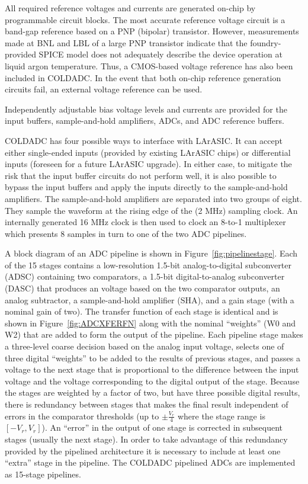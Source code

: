 All required reference voltages and currents are generated on-chip by programmable circuit blocks.  The most accurate reference voltage circuit is a band-gap reference based on a PNP (bipolar) transistor.  However, measurements made at BNL and LBL of a large PNP transistor indicate that the foundry-provided SPICE model does not adequately describe the device operation at liquid argon temperature.  Thus, a CMOS-based voltage reference has also been included in COLDADC.  In the event that both on-chip reference generation circuits fail, an external voltage reference can be used.

Independently adjustable bias voltage levels and currents are provided for the input buffers, sample-and-hold amplifiers, ADCs, and ADC reference buffers.

COLDADC has four possible ways to interface with LArASIC.  It can accept either single-ended inputs (provided by existing LArASIC chips) or differential inputs (foreseen for a future LArASIC upgrade).  In either case, to mitigate the risk that the input buffer circuits do not perform well, it is also possible to bypass the input buffers and apply the inputs directly to the sample-and-hold amplifiers.  The sample-and-hold amplifiers are separated into two groups of eight.  They sample the waveform at the rising edge of the (2 MHz) sampling clock.  An internally generated 16 MHz clock is then used to clock an 8-to-1 multiplexer which presents 8 samples in turn to one of the two ADC pipelines.

A block diagram of an ADC pipeline is shown in Figure~\ref{fig:pipelinestage}. Each of the 15 stages contains a low-resolution 1.5-bit analog-to-digital subconverter (ADSC) containing two comparators, a 1.5-bit digital-to-analog subconverter (DASC) that produces an voltage based on the two comparator outputs, an analog subtractor, a sample-and-hold amplifier (SHA), and a gain stage (with a nominal gain of two). The transfer function of each stage is identical and is shown in Figure~\ref{fig:ADCXFERFN} along with the nominal ``weights'' (W0 and W2) that are added to form the output of the pipeline. Each pipeline stage makes a three-level coarse decision based on the analog input voltage, selects one of three digital ``weights'' to be added to the results of previous stages, and passes a voltage to the next stage that is proportional to the difference between the input voltage and the voltage corresponding to the digital output of the stage.  Because the stages are weighted by a factor of two, but have three possible digital results, there is redundancy between stages that makes the final result independent of errors in the comparator thresholds (up to $\pm{\frac{V_r}{4}}$ where the stage range is $[-V_r,V_r]$).  An ``error'' in the output of one stage is corrected in subsequent stages (usually the next stage).  In order to take advantage of this redundancy provided by the pipelined architecture it is necessary to include at least one ``extra'' stage in the pipeline.  The COLDADC pipelined ADCs are implemented as 15-stage pipelines.

